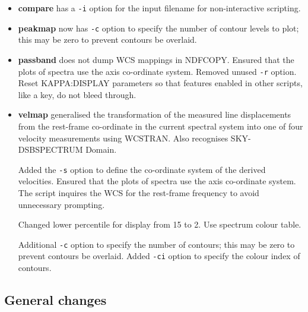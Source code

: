 \documentclass[twoside,11pt]{article}
\newcommand{\htmlref}[2]{#1}
\newcommand{\xref}[3]{#1}
\begin{document}
\begin{itemize}

\item \htmlref{{\bf compare}}{compare} has a {\tt -i} option for the
input filename for non-interactive scripting.

\item \htmlref{{\bf peakmap}}{peakmap} now has {\tt -c} option to 
specify the number of contour levels to plot; this may be zero to
prevent contours be overlaid. 

\item \htmlref{{\bf passband}}{passband} does not dump WCS mappings 
in \xref{NDFCOPY}{sun95}{NDFCOPY}.  Ensured that the plots of spectra 
use the axis co-ordinate system.  Removed unused {\tt -r} option.  Reset
\xref{KAPPA:DISPLAY}{sun95}{DISPLAY} parameters so that features
enabled in other scripts, like a key, do not bleed through.

\item \htmlref{{\bf velmap}}{velmap} generalised the transformation of the
measured line displacements from the rest-frame co-ordinate in the
current spectral system into one of four velocity measurements using
WCSTRAN.  Also recognises SKY-DSBSPECTRUM Domain.  

Added the {\tt -s} option to define the co-ordinate system of the
derived velocities.  Ensured that the plots of spectra use the axis
co-ordinate system.  The script inquires the WCS for the rest-frame
frequency to avoid unnecessary prompting.

Changed lower percentile for display from 15 to 2.  Use spectrum
colour table.

Additional {\tt -c} option to specify the number of contours; this may
be zero to prevent contours be overlaid.  Added {\tt -ci} option to
specify the colour index of contours.

\end{itemize}

\subsection{General changes}
\end{document}
